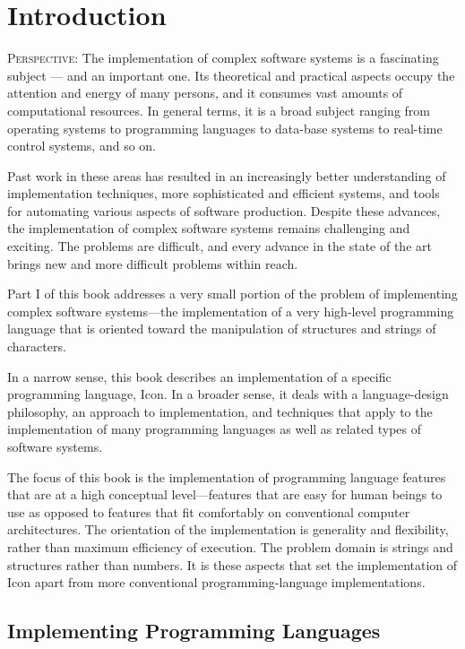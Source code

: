 \chapter{Introduction}
\label{Intro-Chapter}

\textsc{Perspective}: The implementation of complex software systems
is a fascinating subject --- and an important one. Its theoretical and
practical aspects occupy the attention and energy of many persons, and
it consumes vast amounts of computational resources. In general terms,
it is a broad subject ranging from operating systems to programming
languages to data-base systems to real-time control systems, and so
on.


Past work in these areas has resulted in an increasingly better
understanding of implementation techniques, more sophisticated and
efficient systems, and tools for automating various aspects of
software production. Despite these advances, the implementation of
complex software systems remains challenging and exciting. The
problems are difficult, and every advance in the state of the art
brings new and more difficult problems within reach.


Part I of this book addresses a very small portion of the problem of
implementing complex software systems{}---the implementation of a very
high-level programming language that is oriented toward the
manipulation of structures and strings of characters.


In a narrow sense, this book describes an implementation of a specific
programming language, Icon. In a broader sense, it deals with a
language-design philosophy, an approach to implementation, and
techniques that apply to the implementation of many programming
languages as well as related types of software systems.


The focus of this book is the implementation of programming language
features that are at a high conceptual level{}---features that are
easy for human beings to use as opposed to features that fit
comfortably on conventional computer architectures. The orientation of
the implementation is generality and flexibility, rather than maximum
efficiency of execution. The problem domain is strings and structures
rather than numbers. It is these aspects that set the implementation
of Icon apart from more conventional programming-language
implementations.

\section{Implementing Programming Languages}

